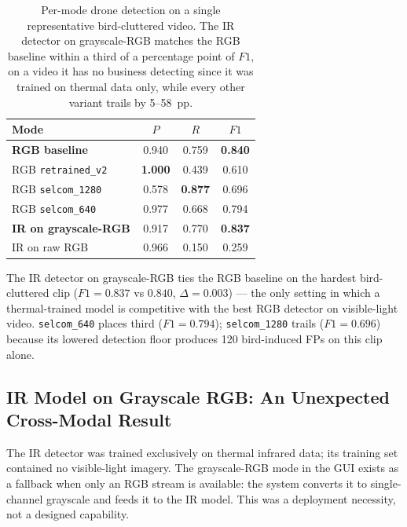 \begin{table}[htbp]
    \centering
    \caption{Per-mode drone detection on a single representative bird-cluttered video. The IR detector on grayscale-RGB matches the RGB baseline within a third of a percentage point of $F1$, on a video it has no business detecting since it was trained on thermal data only, while every other variant trails by 5--58~pp.}
    \label{tab:realvideo_seagull}
    \begin{tabular}{lccc}
        \toprule
        Mode & $P$ & $R$ & $F1$ \\
        \midrule
        \textbf{RGB baseline}           & 0.940 & 0.759 & \textbf{0.840} \\
        RGB \texttt{retrained\_v2} & \textbf{1.000} & 0.439 & 0.610 \\
        RGB \texttt{selcom\_1280}  & 0.578 & \textbf{0.877} & 0.696 \\
        RGB \texttt{selcom\_640}   & 0.977 & 0.668 & 0.794 \\
        \textbf{IR on grayscale-RGB} & 0.917 & 0.770 & \textbf{0.837} \\
        IR on raw RGB          & 0.966 & 0.150 & 0.259 \\
        \bottomrule
    \end{tabular}
\end{table}

\noindent The IR detector on grayscale-RGB ties the RGB baseline on the hardest bird-cluttered clip ($F1 = 0.837$ vs $0.840$, $\Delta=0.003$) --- the only setting in which a thermal-trained model is competitive with the best RGB detector on visible-light video. \texttt{selcom\_640} places third ($F1=0.794$); \texttt{selcom\_1280} trails ($F1=0.696$) because its lowered detection floor produces 120 bird-induced FPs on this clip alone.

\subsection{IR Model on Grayscale RGB: An Unexpected Cross-Modal Result}
\label{sec:grayscale}

The IR detector was trained exclusively on thermal infrared data; its training set contained no visible-light imagery. The grayscale-RGB mode in the GUI exists as a fallback when only an RGB stream is available: the system converts it to single-channel grayscale and feeds it to the IR model. This was a deployment necessity, not a designed capability.

